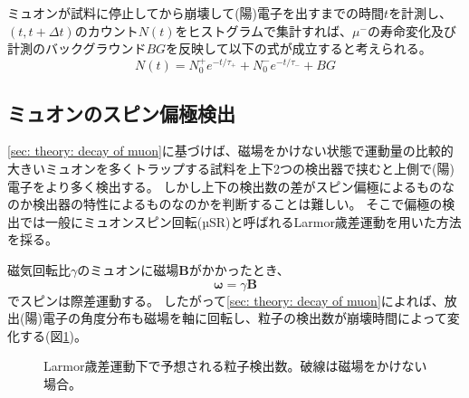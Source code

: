 \documentclass[dvipdfmx]{jsarticle}
\begin{document}

ミュオンが試料に停止してから崩壊して(陽)電子を出すまでの時間$t$を計測し、$(t,t+\Delta t)$のカウント$N(t)$をヒストグラムで集計すれば、$\mu^-$の寿命変化及び計測のバックグラウンド$BG$を反映して以下の式が成立すると考えられる。
\begin{equation}
    \label{eq: N of t considering different tau and BG}
    N(t)
    =
    N_0^+e^{-t/\tau_+}
    +
    N_0^-e^{-t/\tau_-}
    +
    BG
\end{equation}


\subsection{ミュオンのスピン偏極検出}

\ref{sec: theory: decay of muon}に基づけば、磁場をかけない状態で運動量の比較的大きいミュオンを多くトラップする試料を上下2つの検出器で挟むと上側で(陽)電子をより多く検出する。
しかし上下の検出数の差がスピン偏極によるものなのか検出器の特性によるものなのかを判断することは難しい。
そこで偏極の検出では一般にミュオンスピン回転(µSR)と呼ばれるLarmor歳差運動を用いた方法を採る。

磁気回転比$\gamma$のミュオンに磁場$\bm{B}$がかかったとき、
\begin{equation}
    \label{eq: Larmor precession}
    \bm{\omega}=\gamma\bm{B}
\end{equation}
でスピンは際差運動する。
したがって\ref{sec: theory: decay of muon}によれば、放出(陽)電子の角度分布も磁場を軸に回転し、粒子の検出数が崩壊時間によって変化する(図\ref{fig: theory: N under Larmor})。

\begin{figure}
    \centering
    
    \caption[]{Larmor歳差運動下で予想される粒子検出数。破線は磁場をかけない場合。}
    \label{fig: theory: N under Larmor}
\end{figure}
\end{document}
